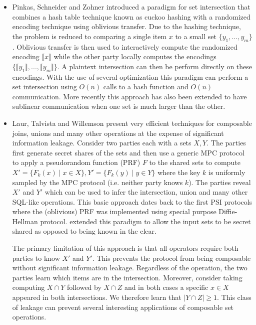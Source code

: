 \begin{itemize}
\item Pinkas, Schneider and Zohner \cite{usenix:PSZ14} introduced a paradigm for set intersection that combines a hash table technique known as cuckoo hashing with a randomized encoding technique using oblivious transfer. Due to the hashing technique, the problem is reduced to comparing a single item $x$ to a small set $\{y_1,...,y_m\}$. Oblivious transfer is then used to interactively compute the randomized encoding $\llbracket x\rrbracket$ while the other party locally computes the encodings $\{\llbracket y_1\rrbracket,...,\llbracket y_m\rrbracket \}$. A plaintext intersection can then be perform directly on these encodings. With the use of several optimization\cite{USENIX:PSSZ15,USENIX:PSZ16,CCS:KKRT16} this paradigm can perform a set intersection using $O(n)$ calls to a hash function and $O(n)$ communication. More recently this approach has also been extended\cite{CLR17} to have sublinear communication when one set is much larger than the other.

\item Laur, Talvista and Willemson\cite{LTW13} present very efficient techniques for composable joins, unions and  many other operations at the expense of significant information leakage. Consider two parties each with a sets $X,Y$. The parties first generate secret shares of the sets and then use a generic MPC protocol to apply a pseudorandom function (PRF) $F$ to the shared sets to compute $X' = \{F_k(x) \mid x\in X\}, Y'=\{F_k(y) \mid y\in Y\}$ where the key $k$ is uniformly sampled by the MPC protocol (i.e. neither party knows $k$). The parties reveal $X'$ and $Y'$ which can be used to infer the intersection, union and many other SQL-like operations. This basic approach dates back to the first PSI protocols \cite{meadows,HFH99} where the (oblivious) PRF was implemented using special purpose Diffie-Hellman protocol. \cite{LTW13} extended this paradigm to allow the input sets to be secret shared as opposed to being known in the clear.

The primary limitation of this approach is that all operators require both parties to know $X'$ and $Y'$. This prevents the protocol from being composable without significant information leakage. Regardless of the operation, the two parties learn which items are in the intersection. Moreover, consider taking computing $X\cap Y$ followed by $X\cap Z$ and in both cases a specific $x\in X$ appeared in both intersections. We therefore learn that $|Y\cap Z| \geq 1$. This class of leakage can prevent several interesting applications of composable set operations.


\end{itemize}